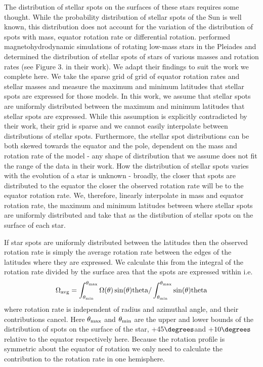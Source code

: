 The distribution of stellar spots on the surfaces of these stars requires some thought.
While the probability distribution of stellar spots of the Sun is well known, this distribution does not account for the variation of the distribution of spots with mass, equator rotation rate or differential rotation.
 \citet{granzer_2003} performed magnetohydrodynamic simulations of rotating low-mass stars in the Pleiades and determined the distribution of stellar spots of stars of various masses and rotation rates (see Figure 3. in their work).
 We adapt their findings to suit the work we complete here.
 We take the sparse grid of grid of equator rotation rates and stellar masses and measure the maximum and minimum latitudes that stellar spots are expressed for those models.
 In this work, we assume that stellar spots are uniformly distributed between the maximum and minimum latitudes that stellar spots are expressed.
 While this assumption is explicitly contradicted by their work, their grid is sparse and we cannot easily interpolate between distributions of stellar spots.
 Furthermore, the stellar spot distributions can be both skewed towards the equator and the pole, dependent on the mass and rotation rate of the model - any shape of distribution that we assume does not fit the range of the data in their work.
How the distribution of stellar spots varies with the evolution of a star is unknown - broadly, the closer that spots are distributed to the equator the closer the observed rotation rate will be to the equator rotation rate.
We, therefore, linearly interpolate in mass and equator rotation rate, the maximum and minimum latitudes between where stellar spots are uniformly distributed and take that as the distibution of stellar spots on the surface of each star.

If star spots are uniformly distributed between the latitudes then the observed rotation rate is simply the average rotation rate between the edges of the latitudes where they are expressed.
We calculate this from the integral of the rotation rate divided by the surface area that the spots are expressed within i.e.
\begin{equation}
	\Omega_{\rm{avg}} = \int^{\theta_{\rm{max}}}_{\theta_{\rm{min}}} \Omega(\theta) \sin(\theta) \rm{theta} /  \int^{\theta_{\rm{max}}}_{\theta_{\rm{min}}} \sin(\theta) \rm{theta}
\end{equation}
where rotation rate is independent of radius and azimuthal angle, and their contributions cancel.
Here $\theta_{\rm{max}}$ and $\theta_{\rm{min}}$ are the upper and lower bounds of the distribution of spots on the surface of the star, +45$\degrees$and +$10 \degrees$ relative to the equator respectively here.
Because the rotation profile is symmetric about the equator of rotation we only need to calculate the contribution to the rotation rate in one hemisphere.


